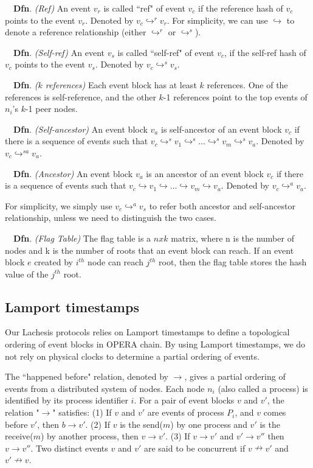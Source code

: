 \documentclass{article}
\newcommand{\dfnn}[2]{$\quad$\textbf{Dfn}. \emph{(#1)} {#2}}
\newcommand{\eself}{\hookrightarrow^{s}}
\newcommand{\eref}{\hookrightarrow^{r}}
\newcommand{\eancestor}{\hookrightarrow^{a}}
\newcommand{\eselfancestor}{\hookrightarrow^{sa}}
\newcommand{\erefz}{\hookrightarrow}
\begin{document}
\dfnn{Ref}{An event $v_r$ is called ``ref" of event $v_c$ if the reference hash of $v_c$ points to the event $v_r$. Denoted by $v_c \eref v_r$. For simplicity, we can use $\erefz$ to denote a reference relationship (either $\eref$ or $\eself$).}

\dfnn{Self-ref}{An event $v_s$ is called ``self-ref" of event $v_c$, if the self-ref hash of $v_c$ points to the event $v_s$. Denoted by $v_c \eself v_s$.}

\dfnn{$k$ references}{Each event block has at least $k$ references. One of the references is self-reference, and the other $k$-1 references point to the top events of $n_i$'s $k$-1 peer nodes.}

\dfnn{Self-ancestor}{An event block $v_a$ is self-ancestor of an event block $v_c$ if there is a sequence of events such that $v_c \eself v_1 \eself \dots \eself v_m \eself v_a $. Denoted by $v_c \eselfancestor v_a$.}

\dfnn{Ancestor}{An event block $v_a$ is an ancestor of an event block $v_c$ if there is a sequence of events such that $v_c \erefz v_1 \erefz \dots \erefz v_m \erefz v_a $. Denoted by $v_c \eancestor v_a$.}

 For simplicity, we simply use $v_c \eancestor v_s$ to refer both ancestor and self-ancestor relationship, unless we need to distinguish the two cases.

\dfnn{Flag Table}{The flag table is a $n x k$ matrix, where n is the number of nodes and k is the number of roots that an event block can reach. If an event block $e$ created by $i^{th}$ node can reach $j^{th}$ root, then the flag table stores the hash value of the $j^{th}$ root.}

\subsection{Lamport timestamps}

Our Lachesis protocols relies on Lamport timestamps to define a topological ordering of event blocks in OPERA chain.  
By using Lamport timestamps, we do not rely on physical clocks to determine a partial ordering of events.

The ``happened before" relation, denoted by $\rightarrow$, gives a partial ordering of events from a distributed system of nodes. 
Each node $n_i$ (also called a process) is identified by its process identifier $i$. 
For a pair of event blocks $v$ and $v'$, the relation "$\rightarrow$" satisfies: (1) If $v$ and $v'$ are events of process $P_i$, and $v$ comes before $v'$, then $b \rightarrow v'$. (2) If $v$ is the send($m$) by one process and $v'$ is the receive($m$) by another process, then $v \rightarrow v'$. (3) If $v \rightarrow v'$ and $v' \rightarrow v''$ then $v \rightarrow v''$. 
Two distinct events $v$ and $v'$ are said to be concurrent if $v \nrightarrow v'$ and $v' \nrightarrow v$.
\end{document}

